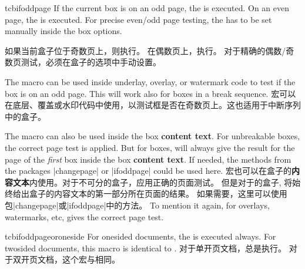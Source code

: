 \begin{docCommand}[doc new=2015-11-13]{tcbifoddpage}{}
 If the current box is on an odd page, the  is executed.
 On an even page, the  is executed.
 For precise even/odd page testing, the  has to be
 set manually inside the box options.

如果当前盒子位于奇数页上，则执行。%
在偶数页上，执行。%
对于精确的偶数/奇数页测试，必须在盒子的选项中手动设置。

 The macro  can be used inside underlay, overlay, or watermark code to
 test if the box is on an odd page. This will work also for boxes in a break sequence.
宏可以在底层、覆盖或水印代码中使用，以测试框是否在奇数页上。这也适用于中断序列中的盒子。

 The macro can also be used inside the box \textbf{content text}. For unbreakable boxes,
 the correct page test is applied.
 But for  boxes, 
 will always give the result for the page of the \emph{first} box inside
 the box \textbf{content text}. If needed, the methods from the packages
 |changepage| or |ifoddpage| could be used here.
宏也可以在盒子的\textbf{内容文本}内使用。对于不可分的盒子，应用正确的页面测试。%
但是对于的盒子, 将始终给出盒子的内容文本的第一部分所在页面的结果。 如果需要，这里可以使用包|changepage|或|ifoddpage|中的方法。
To mention it again, for overlays, watermarks, etc,  gives
the correct page test.

\begin{dispExample}

\begin{tcolorbox}[enhanced,check odd page,
title={Example for a box on an \tcbifoddpage{odd}{even} page},
watermark text={\tcbifoddpage{Odd}{Even} page!}]
\lipsum[1]
\end{tcolorbox}
\end{dispExample}
\end{docCommand}




\begin{docCommand}[doc new=2016-11-18]{tcbifoddpageoroneside}{}
 For onesided documents, the  is executed always.
 For twosided documents, this macro is identical to .
对于单开页文档，总是执行。%
对于双开页文档，这个宏与相同。
\end{docCommand}


